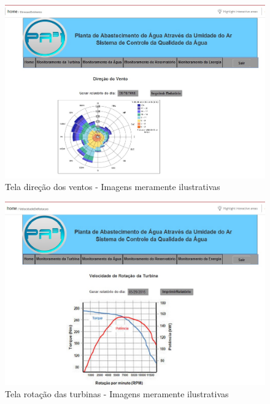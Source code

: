 \begin{center}
\begin{figure}[!ht]
\centering
\includegraphics[scale=0.5]{figuras/direcao_do_vento}
\caption[Tela direção dos ventos]{Tela direção dos ventos - Imagens meramente ilustrativas}
\label{tela_direcao_dos_ventos}
\end{figure}
\clearpage

\begin{figure}[!ht]
\centering
\includegraphics[scale=0.5]{figuras/4}
\caption[Tela rotação das turbinas]{Tela rotação das turbinas - Imagens meramente ilustrativas}
\label{tela_rotacao_das_turbinas}
\end{figure}



\end{center}
